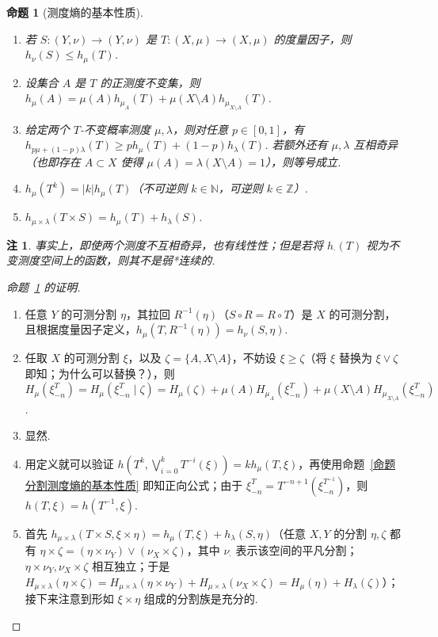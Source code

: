 \documentclass[11pt, a4paper, oneside]{ctexart}
\newtheorem{proposition}[theorem]{命题}
\newtheorem{remark}[theorem]{注}
\newcommand{\N}{\mathbb{N}}
\newcommand{\Z}{\mathbb{Z}}
\newcommand{\abs}[1]{\left|{#1}\right|}
\begin{document}
    \begin{proposition}[测度熵的基本性质]\label{命题测度熵的基本性质}
        \begin{enumerate}[(1)]
            \item 若 $S:(Y,\nu)\to (Y,\nu)$ 是 $T:(X,\mu)\to (X,\mu)$ 的度量因子，则 $h_{\nu}(S)\leq h_{\mu}(T)$.
            \item 设集合 $A$ 是 $T$ 的正测度不变集，则 $h_{\mu}(A)=\mu(A)h_{\mu_A}(T)+\mu(X\setminus A)h_{\mu_{X\setminus A}}(T)$.
            \item 给定两个 $T$-不变概率测度 $\mu,\lambda$，则对任意 $p\in [0,1]$，有 $h_{p\mu+(1-p)\lambda}(T)\geq ph_{\mu}(T)+(1-p)h_{\lambda}(T)$. 若额外还有 $\mu,\lambda$ 互相奇异（也即存在 $A\subset X$ 使得 $\mu(A)=\lambda(X\setminus A)=1$），则等号成立.
            \item $h_{\mu}(T^k)=\abs{k}h_{\mu}(T)$（不可逆则 $k\in\N$，可逆则 $k\in \Z$）.
            \item $h_{\mu\times \lambda}(T\times S)=h_{\mu}(T)+h_{\lambda}(S)$.
        \end{enumerate}
    \end{proposition}
    \begin{remark}
        事实上，即使两个测度不互相奇异，也有线性性；但是若将 $h_{\cdot}(T)$ 视为不变测度空间上的函数，则其不是弱*连续的.
    \end{remark}
    \begin{proof}[命题~\ref{命题测度熵的基本性质} 的证明]
        \begin{enumerate}[(1)]
            \item 任意 $Y$ 的可测分割 $\eta$，其拉回 $R^{-1}(\eta)$（$S\circ R=R\circ T$）是 $X$ 的可测分割，且根据度量因子定义，$h_{\mu}(T,R^{-1}(\eta))=h_{\nu}(S,\eta)$.
            \item 任取 $X$ 的可测分割 $\xi$，以及 $\zeta=\{A,X\setminus A\}$，不妨设 $\xi\geq \zeta$（将 $\xi$ 替换为 $\xi\vee \zeta$ 即知；为什么可以替换？），则 $H_{\mu}(\xi_{-n}^T)=H_{\mu}(\xi_{-n}^T\mid \zeta)=H_{\mu}(\zeta)+\mu(A)H_{\mu_A}(\xi_{-n}^T)+\mu(X\setminus A)H_{\mu_{X\setminus A}}(\xi_{-n}^T)$.
            \item 显然.
            \item 用定义就可以验证 $h(T^k,\bigvee\limits_{i=0}^{k}T^{-i}(\xi))=kh_{\mu}(T,\xi)$，再使用命题~\ref{命题分割测度熵的基本性质} 即知正向公式；由于 $\xi_{-n}^T=T^{-n+1}(\xi_{-n}^{T^{-1}})$，则 $h(T,\xi)=h(T^{-1},\xi)$.
            \item 首先 $h_{\mu\times\lambda}(T\times S,\xi\times\eta)=h_{\mu}(T,\xi)+h_{\lambda}(S,\eta)$（任意 $X,Y$ 的分割 $\eta,\zeta$ 都有 $\eta\times\zeta=(\eta\times \nu_Y)\vee(\nu_X\times \zeta)$，其中 $\nu_{\cdot}$ 表示该空间的平凡分割；$\eta\times \nu_Y,\nu_X\times \zeta$ 相互独立；于是 $H_{\mu\times \lambda}(\eta\times\zeta)=H_{\mu\times\lambda}(\eta\times\nu_Y)+H_{\mu\times\lambda}(\nu_X\times\zeta)=H_{\mu}(\eta)+H_{\lambda}(\zeta)$）；接下来注意到形如 $\xi\times\eta$ 组成的分割族是充分的.
        \end{enumerate}
    \end{proof}
\end{document}
